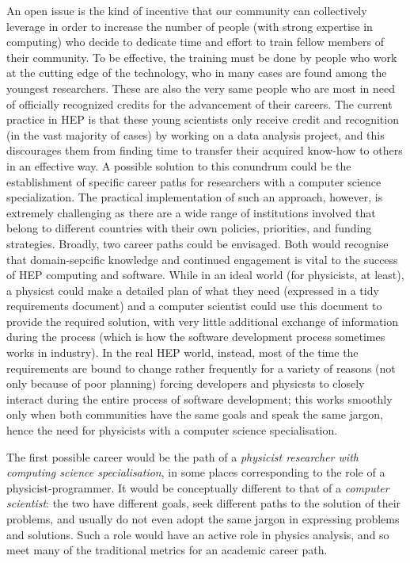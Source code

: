 An open issue is the kind of incentive that our community can collectively leverage in order to increase the number of people (with strong expertise in computing) who decide to dedicate time and effort to train fellow members of their community. 
To be effective, the training must be done by people who work at the cutting edge of the technology, who in many cases are found among the youngest researchers. These are also the very same people who are most in need of officially recognized credits for the advancement of their careers. The current practice in HEP is that these young scientists only receive credit and recognition (in the vast majority of cases) by working on a data analysis project, and this discourages them from finding time to transfer their acquired know-how to others in an effective way. A possible solution to this conundrum could be the establishment of specific career paths for researchers with a computer science specialization. The practical implementation of such an approach, however, is extremely challenging as there are a wide range of institutions involved that belong to different countries with their own policies, priorities, and funding strategies. Broadly, two career paths could be envisaged. Both would recognise that domain-sepcific knowledge and continued engagement is vital to the success of HEP computing and software. While in an ideal world (for physicists, at least), a physicst could make a detailed plan of what they need (expressed in a tidy requirements document) and a computer scientist could use this document to provide the required solution, with very little additional exchange of information during the process (which is how the software development process sometimes works in industry). In the real HEP world, instead, most of the time the requirements are bound to change rather frequently for a variety of reasons (not only because of poor planning) forcing developers and physicsts to closely interact during the entire process of software development; this works smoothly only when both communities have the same goals and speak the same jargon, hence the need for physicists with a computer science specialisation.

The first possible career would be the path of a \emph{physicist researcher with computing science specialisation}, in some places corresponding to the role of a physicist-programmer. It would be conceptually different to that of a \emph{computer scientist}: the two have different goals, seek different paths to the solution of their problems, and usually do not even adopt the same jargon in expressing problems and solutions. Such a role would have an active role in physics analysis, and so meet many of the traditional metrics for an academic career path.

